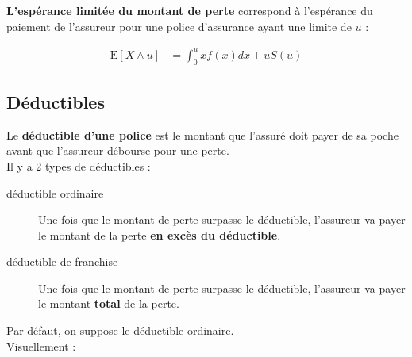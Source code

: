 \documentclass[10pt, french]{article}
\begin{document}
\begin{multicols*}{2}
\begin{definitionNOHFILLsub}
\begin{center}
\begin{tikzpicture}[x=0.75pt,y=0.75pt,yscale=-1,xscale=1]
\end{tikzpicture}
\end{center}
\end{definitionNOHFILLsub}

\begin{definitionNOHFILLsub}
\textbf{L'espérance limitée du montant de perte}  correspond à l'espérance du paiement de l'assureur pour une police d'assurance ayant une limite de $u$ :

\begin{align*}
	\text{E}[X \wedge u]	
	&=	\int_{0}^{u} x f(x) dx + u S(u)
\end{align*}
\end{definitionNOHFILLsub}


\columnbreak
\subsection{Déductibles}
\begin{definitionNOHFILL}[Déductible]
Le \textbf{déductible d'une police} est le montant que l'assuré doit payer de sa poche avant que l'assureur débourse pour une perte. \\

Il y a 2 types de déductibles : 
\begin{description}
	\item[déductible ordinaire]	Une fois que le montant de perte surpasse le déductible, l'assureur va payer le montant de la perte \textbf{en excès du déductible}.
	\item[déductible de franchise]	Une fois que le montant de perte surpasse le déductible, l'assureur va payer le montant \textbf{total} de la perte.
\end{description}

Par défaut, on suppose le déductible ordinaire.\\

Visuellement :

\begin{center}
\begin{tikzpicture}[x=0.75pt,y=0.75pt,yscale=-1,xscale=1]


\end{tikzpicture}
\end{center}
\end{definitionNOHFILL}
\end{multicols*}
\end{document}
